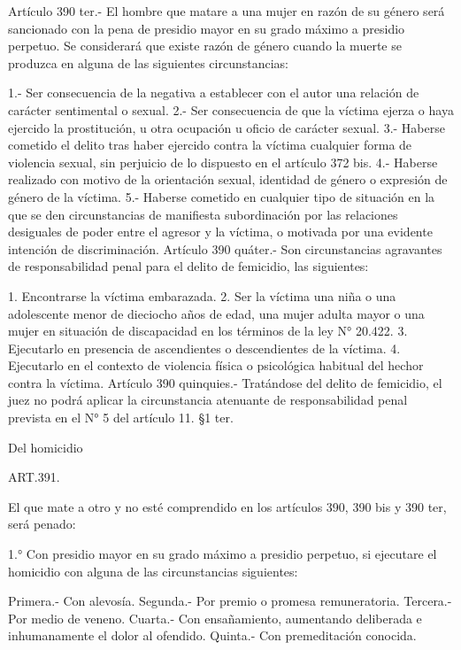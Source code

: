     Artículo 390 ter.- El hombre que matare a una mujer en razón de su género será sancionado con la pena de presidio mayor en su grado máximo a presidio perpetuo.
    Se considerará que existe razón de género cuando la muerte se produzca en alguna de las siguientes circunstancias:
     
    1.- Ser consecuencia de la negativa a establecer con el autor una relación de carácter sentimental o sexual.
    2.- Ser consecuencia de que la víctima ejerza o haya ejercido la prostitución, u otra ocupación u oficio de carácter sexual.
    3.- Haberse cometido el delito tras haber ejercido contra la víctima cualquier forma de violencia sexual, sin perjuicio de lo dispuesto en el artículo 372 bis.
    4.- Haberse realizado con motivo de la orientación sexual, identidad de género o expresión de género de la víctima.
    5.- Haberse cometido en cualquier tipo de situación en la que se den circunstancias de manifiesta subordinación por las relaciones desiguales de poder entre el agresor y la víctima, o motivada por una evidente intención de discriminación.
    Artículo 390 quáter.- Son circunstancias agravantes de responsabilidad penal para el delito de femicidio, las siguientes:
     
    1. Encontrarse la víctima embarazada.
    2. Ser la víctima una niña o una adolescente menor de dieciocho años de edad, una mujer adulta mayor o una mujer en situación de discapacidad en los términos de la ley N° 20.422.
    3. Ejecutarlo en presencia de ascendientes o descendientes de la víctima.
    4. Ejecutarlo en el contexto de violencia física o psicológica habitual del hechor contra la víctima.
    Artículo 390 quinquies.- Tratándose del delito de femicidio, el juez no podrá aplicar la circunstancia atenuante de responsabilidad penal prevista en el N° 5 del artículo 11.
    §1 ter.

    Del homicidio


    ART.391.

    El que mate a otro y no esté comprendido en los artículos 390, 390 bis y 390 ter, será penado:

    1.° Con presidio mayor en su grado máximo a presidio perpetuo, si ejecutare el homicidio con alguna de las circunstancias siguientes:

    Primera.- Con alevosía.
    Segunda.- Por premio o promesa remuneratoria.
    Tercera.- Por medio de veneno.
    Cuarta.- Con ensañamiento, aumentando deliberada e inhumanamente el dolor al ofendido.
    Quinta.- Con premeditación conocida.

